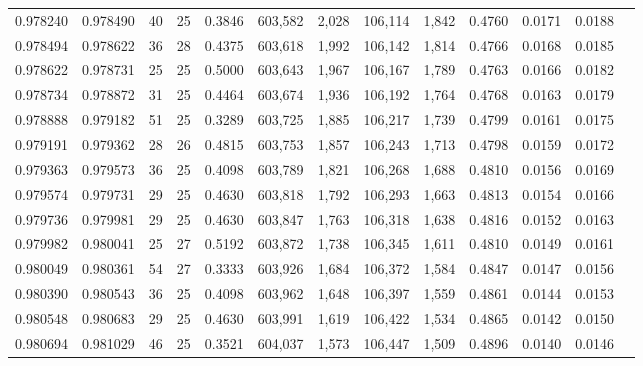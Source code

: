 \begin{tabular}{rrrrrrrrrrrrr}
0.978240 & 0.978490 &    40 &  25 &                                     0.3846 & 603,582 &   2,028 & 106,114 &   1,842 & 0.4760 & 0.0171 & 0.0188 \\
0.978494 & 0.978622 &    36 &  28 &                                     0.4375 & 603,618 &   1,992 & 106,142 &   1,814 & 0.4766 & 0.0168 & 0.0185 \\
0.978622 & 0.978731 &    25 &  25 &                                     0.5000 & 603,643 &   1,967 & 106,167 &   1,789 & 0.4763 & 0.0166 & 0.0182 \\
0.978734 & 0.978872 &    31 &  25 &                                     0.4464 & 603,674 &   1,936 & 106,192 &   1,764 & 0.4768 & 0.0163 & 0.0179 \\
0.978888 & 0.979182 &    51 &  25 &                                     0.3289 & 603,725 &   1,885 & 106,217 &   1,739 & 0.4799 & 0.0161 & 0.0175 \\
0.979191 & 0.979362 &    28 &  26 &                                     0.4815 & 603,753 &   1,857 & 106,243 &   1,713 & 0.4798 & 0.0159 & 0.0172 \\
0.979363 & 0.979573 &    36 &  25 &                                     0.4098 & 603,789 &   1,821 & 106,268 &   1,688 & 0.4810 & 0.0156 & 0.0169 \\
0.979574 & 0.979731 &    29 &  25 &                                     0.4630 & 603,818 &   1,792 & 106,293 &   1,663 & 0.4813 & 0.0154 & 0.0166 \\
0.979736 & 0.979981 &    29 &  25 &                                     0.4630 & 603,847 &   1,763 & 106,318 &   1,638 & 0.4816 & 0.0152 & 0.0163 \\
0.979982 & 0.980041 &    25 &  27 &                                     0.5192 & 603,872 &   1,738 & 106,345 &   1,611 & 0.4810 & 0.0149 & 0.0161 \\
0.980049 & 0.980361 &    54 &  27 &                                     0.3333 & 603,926 &   1,684 & 106,372 &   1,584 & 0.4847 & 0.0147 & 0.0156 \\
0.980390 & 0.980543 &    36 &  25 &                                     0.4098 & 603,962 &   1,648 & 106,397 &   1,559 & 0.4861 & 0.0144 & 0.0153 \\
0.980548 & 0.980683 &    29 &  25 &                                     0.4630 & 603,991 &   1,619 & 106,422 &   1,534 & 0.4865 & 0.0142 & 0.0150 \\
0.980694 & 0.981029 &    46 &  25 &                                     0.3521 & 604,037 &   1,573 & 106,447 &   1,509 & 0.4896 & 0.0140 & 0.0146 \\

\end{tabular}

